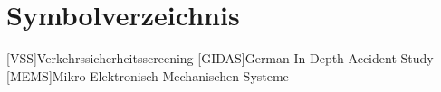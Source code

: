 \chapter*{Symbolverzeichnis}
\begin{acronym}[BreiteDerLinkenSpalte]
[VSS]{Verkehrssicherheitsscreening}
[GIDAS]{German In-Depth Accident Study}
[MEMS]{Mikro Elektronisch Mechanischen Systeme}
\end{acronym}